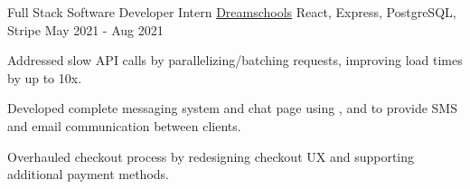 \begin{cventries}

  \cventry
    {Full Stack Software Developer Intern} %
    {\href{https://dreamschools.com/}{Dreamschools}} %
    {React, Express, PostgreSQL, Stripe} %
    {May 2021 - Aug 2021} %
    {
      \begin{cvitems} %
        \item {Addressed slow  API calls by parallelizing/batching requests, improving load times by up to 10x.}
        \item {Developed complete messaging system and chat page using ,  and  to provide SMS and email communication between clients.}
        \item {Overhauled checkout process by redesigning checkout UX and supporting additional payment methods.}
      \end{cvitems}
    }
\end{cventries}
